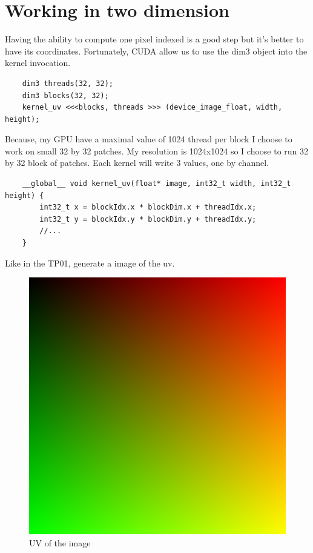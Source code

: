 \documentclass{article}
\begin{document}
\section{Working in two dimension}
Having the ability to compute one pixel indexed is a good step but it's better to have its coordinates. Fortunately, CUDA allow us to use the dim3 object into the kernel invocation.
\begin{lstlisting}
	dim3 threads(32, 32);
	dim3 blocks(32, 32);
	kernel_uv <<<blocks, threads >>> (device_image_float, width, height);
\end{lstlisting}
Because, my GPU have a maximal value of 1024 thread per block I choose to work on small 32 by 32 patches. My resolution is 1024x1024 so I choose to run 32 by 32 block of patches. Each kernel will write 3 values, one by channel.
\begin{lstlisting}
	__global__ void kernel_uv(float* image, int32_t width, int32_t height) {
		int32_t x = blockIdx.x * blockDim.x + threadIdx.x;
		int32_t y = blockIdx.y * blockDim.y + threadIdx.y;
		//...
	}
\end{lstlisting}
Like in the TP01, generate a image of the uv.

\begin{figure}[H]
	\centering
	\includegraphics[scale=0.3]{figures/uv.png}
	\caption{UV of the image}
\end{figure}
\end{document}

